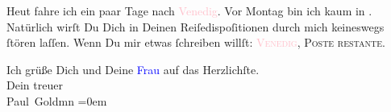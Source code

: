 \pstart
           Heut fahre ich ein paar Tage nach \textcolor{pink}{Venedig}{}\ledrightnote{\textcolor{pink}{Venedig}}. Vor Montag bin ich kaum
               in \label{K_L03386-4v}\label{K_L03386-4h}. Natürlich wirſt Du Dich in
               Deinen Reiſedispoſitionen durch mich keineswegs ſtören laſſen. Wenn Du mir etwas
               ſchreiben willſt: \textsc{\textcolor{pink}{Venedig}{}\ledrightnote{\textcolor{pink}{Venedig}}, Poste restante}.\pend
           
\pstart
           Ich grüße Dich und Deine \textcolor{blue}{Frau}{}\ledrightnote{{$\rightarrow$}\textcolor{blue}{Olga Schnitzler}} auf das Herzlichſte. {\\[\baselineskip]}Dein treuer {\\[\baselineskip]}\spacefill\mbox{Paul Goldmn}\pend
           \leftskip=0em{}\endnumbering{}  
      
